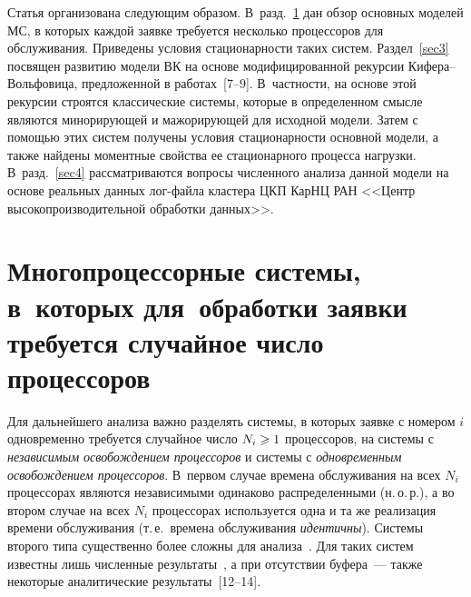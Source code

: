 \begin{multicols}{2}
Статья организована следующим образом.  В~разд.~\ref{sec2} дан
 обзор  основных моделей МС, в которых каждой заявке требуется несколько
процессоров для обслуживания. Приведены    условия стационар\-ности
таких систем. Раздел~\ref{sec3} посвящен развитию модели ВК на
основе модифицированной рекурсии Ки\-фе\-ра--Воль\-фо\-ви\-ца, предложенной в
работах~[7--9]. В~част\-ности, на основе этой рекурсии строятся
классические системы, которые в определенном смысле являются
минорирующей и мажорирующей для исходной модели. Затем с помощью
этих систем получены
 условия  стационарности основной модели, а также найдены   моментные свойства
ее стационарного процесса  нагрузки. В~разд.~\ref{sec4}
рассматриваются  вопросы численного анализа данной  модели  на
основе реальных данных лог-фай\-ла кластера ЦКП КарНЦ РАН <<Центр
высокопроизводительной обработки данных>>.

\section{Многопроцессорные системы, в~которых для~обработки заявки 
требуется случайное число процессоров}\label{sec2}

Для дальнейшего анализа  важно  разделять сис\-те\-мы, в которых заявке
с номером $i$ одновременно требуется случайное число $N_i\hm\geqslant 1$
процессоров, на  системы с {\it независимым освобождением
процессоров} и системы с {\it одновременным освобождением
процессоров}. В~первом случае времена обслуживания на всех $N_i$
процессорах являются независимыми одинаково распределенными (н.\,о.\,р.),
а во втором случае  на всех $N_i$ процессорах используется одна и та
же реализация   времени обслуживания (т.\,е.\ времена обслуживания
{\it идентичны}). Системы второго  типа существенно более сложны для
анализа~\cite{green80-1}. Для таких систем   известны лишь
численные результаты~\cite{kim78},  а при отсутствии буфера~---
также некоторые аналитические результаты~[12--14].


\end{multicols}
